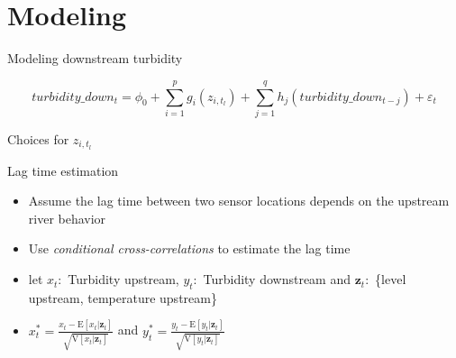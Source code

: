 \documentclass[14pt,ignorenonframetext,compress]{beamer}
\begin{document}
\hypertarget{modeling}{%
\section{Modeling}\label{modeling}}

\begin{frame}{Modeling downstream turbidity}
\protect\hypertarget{modeling-downstream-turbidity}{}
\small

\begin{equation*}\label{eq:gam_main}
turbidity\_down_t = \phi_0 + \sum_{i=1}^pg_i(z_{i,t_l}) + \sum_{j=1}^qh_j(turbidity\_down_{t-j}) + \varepsilon_t
\end{equation*}

\begin{block}{Choices for \(z_{i,t_l}\)}
\protect\hypertarget{choices-for-z_it_l}{}
\begin{table}
\centering\begingroup\fontsize{10}{12}\selectfont

\endgroup{}
\end{table}
\end{block}
\end{frame}

\begin{frame}{Lag time estimation}
\protect\hypertarget{lag-time-estimation}{}
\begin{itemize}
\item
  Assume the lag time between two sensor locations depends on the
  upstream river behavior
\item
  Use \emph{conditional cross-correlations} to estimate the lag time
\item
  let \(x_t:\) Turbidity upstream, \(y_t:\) Turbidity downstream and
  \(\bm{z}_t:\) \{level upstream, temperature upstream\}
\item
  \(x^*_t = \frac{x_t - \text{E}[x_t|\bm{z}_t]}{\sqrt{\text{V}[x_t|\bm{z}_t]}}\)
  and
  \(y^*_t = \frac{y_t - \text{E}[y_t|\bm{z}_t]}{\sqrt{\text{V}[y_t|\bm{z}_t]}}\)
\end{itemize}
\end{frame}
\end{document}
